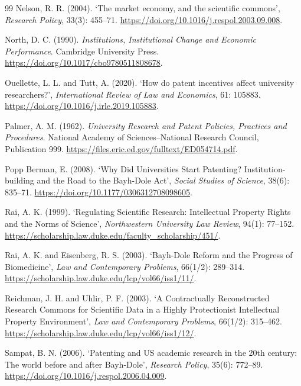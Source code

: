 \begin{thebibliography}{99}
 Nelson, R. R. (2004). `The market economy, and the scientific commons', \emph{Research Policy}, 33(3): 455--71. \url{https://doi.org/10.1016/j.respol.2003.09.008}.

 North, D. C. (1990). \emph{Institutions, Institutional Change and Economic Performance}. Cambridge University Press. \url{https://doi.org/10.1017/cbo9780511808678}.

 Ouellette, L. L. and Tutt, A. (2020). `How do patent incentives affect university researchers?', \emph{International Review of Law and Economics}, 61: 105883. \url{https://doi.org/10.1016/j.irle.2019.105883}.

 Palmer, A. M. (1962). \emph{University Research and Patent Policies, Practices and Procedures}. National Academy of Sciences--National Research Council, Publication 999. \url{https://files.eric.ed.gov/fulltext/ED054714.pdf}.

 Popp Berman, E. (2008). `Why Did Universities Start Patenting? Institution-building and the Road to the Bayh-Dole Act', \emph{Social Studies of Science}, 38(6): 835--71. \url{https://doi.org/10.1177/0306312708098605}.

 Rai, A. K. (1999). `Regulating Scientific Research: Intellectual Property Rights and the Norms of Science', \emph{Northwestern University Law Review}, 94(1): 77--152. \url{https://scholarship.law.duke.edu/faculty_scholarship/451/}.

 Rai, A. K. and Eisenberg, R. S. (2003). `Bayh-Dole Reform and the Progress of Biomedicine', \emph{Law and Contemporary Problems}, 66(1/2): 289--314. \url{https://scholarship.law.duke.edu/lcp/vol66/iss1/11/}.

 Reichman, J. H. and Uhlir, P. F. (2003). `A Contractually Reconstructed Research Commons for Scientific Data in a Highly Protectionist Intellectual Property Environment', \emph{Law and Contemporary Problems}, 66(1/2): 315--462. \url{https://scholarship.law.duke.edu/lcp/vol66/iss1/12/}.

 Sampat, B. N. (2006). `Patenting and US academic research in the 20th century: The world before and after Bayh-Dole', \emph{Research Policy}, 35(6): 772--89. \url{https://doi.org/10.1016/j.respol.2006.04.009}.


\end{thebibliography}
